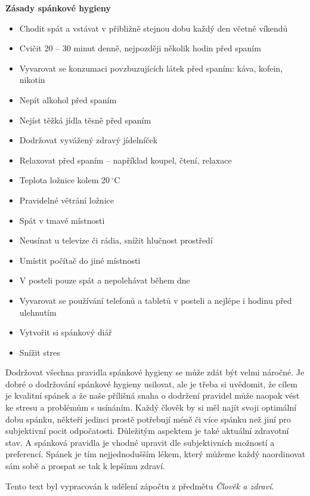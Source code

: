 \documentclass[a4paper]{scrartcl}
\begin{document}
\textbf{Zásady spánkové hygieny} \cite{brain_basics_ninds, nhs_lack_of_sleep, nhs_sleep_tips,medical_news_sleep_tips}
    \begin{itemize}
        \item Chodit spát a vstávat v přibližně stejnou dobu každý den
            včetně víkendů
        \item Cvičit 20 -- 30 minut denně, nejpozději několik hodin
            před spaním
        \item Vyvarovat se konzumaci povzbuzujících látek před spaním:
            káva, kofein, nikotin
        \item Nepít alkohol před spaním
        \item Nejíst těžká jídla těsně před spaním
        \item Dodržovat vyvážený zdravý jídelníček
        \item Relaxovat před spaním -- například koupel, čtení,
            relaxace
        \item Teplota ložnice kolem 20$\,^{\circ}$C
        \item Pravidelné větrání ložnice
        \item Spát v tmavé místnosti
        \item Neusínat u televize či rádia, snížit hlučnost prostředí
        \item Umístit počítač do jiné místnosti
        \item V posteli pouze spát a nepolehávat během dne
        \item Vyvarovat se používání telefonů a tabletů v posteli a 
            nejlépe i hodinu před ulehnutím
        \item Vytvořit si spánkový diář
        \item Snížit stres
    \end{itemize}

Dodržovat všechna pravidla spánkové hygieny se může zdát být velmi
náročné. Je dobré o dodržování spánkové hygieny usilovat, ale
je třeba si uvědomit, že cílem je kvalitní spánek a že naše přílišná
snaha o dodržení pravidel může naopak vést ke stresu a problémům 
s usínáním. Každý člověk by si měl najít svoji optimální dobu spánku, někteří jedinci 
prostě potřebují méně či více spánku než jiní pro subjektivní pocit odpočatosti.
Důležitým aspektem je také aktuální zdravotní stav.
A spánková pravidla je vhodné upravit 
dle subjektivních možností a preferencí. Spánek je tím nejjednodušším
lékem, který můžeme každý naordinovat sám sobě a prospat se tak k 
lepšímu zdraví.


\vspace{36pt}
\indent Tento text byl vypracován k udělení zápočtu z 
předmětu \emph{Člověk a zdraví}.


\newpage
%


\end{document}
